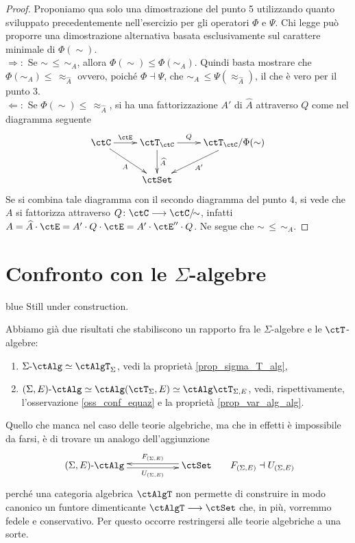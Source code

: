 \begin{proof}
 Proponiamo qua solo una dimostrazione del punto 5 utilizzando quanto sviluppato precedentemente nell'esercizio
 per gli operatori \(\Phi\) e \(\Psi\). Chi legge può proporre una dimostrazione alternativa basata esclusivamente
 sul carattere minimale di \(\Phi(\sim)\). \\
 \(\Rightarrow \colon\) Se \(\sim \,\leq\, \sim_A\), allora \(\Phi(\sim) \leq \Phi(\sim_A)\). Quindi basta mostrare che
 \(\Phi(\sim_A) \leq\, \approx_{\widehat{A}}\) ovvero, poiché \(\Phi \dashv \Psi\), che \(\sim_A \,\leq \Psi(\approx_{\widehat{A}})\),
 il che è vero per il punto 3. \\
 \(\Leftarrow \colon\) Se \(\Phi(\sim) \leq\, \approx_{\widehat{A}}\), si ha una fattorizzazione \(A'\) di \(\widehat{A}\) attraverso \(Q\) come
 nel diagramma seguente
 \[\xymatrix{\ctC \ar[r]^-{\ctE} \ar[rd]_{A}  & \ctT_\ctC \ar[r]^-{Q} \ar[d]^{\widehat{A}} & \ctT_\ctC/\Phi(\sim) \ar[ld]^{A'} \\ & \ctSet }\]
 Se si combina tale diagramma con il secondo diagramma del punto 4, si vede che \(A\) si fattorizza attraverso
 \(Q \colon \ctC \fun \ctC/{\!\sim}\), infatti \(A = \widehat{A} \cmp \ctE = A' \cmp Q \cmp \ctE = A' \cmp \ctE'' \cmp Q\).
 Ne segue che \(\sim \,\leq\, \sim_A\).
\end{proof}

\section{Confronto con le \(\Sigma\)-algebre}\label{sec_confr_sigma_T}

\begin{color}{blue}
 Still under construction.
\end{color}

\hfill

Abbiamo già due risultati che stabiliscono un rapporto fra le \(\Sigma\)-algebre e le \(\ctT\)-algebre:
\begin{enumerate}
 \item \(\ctSAlg \simeq \ctAlgT_{\Sigma}\), vedi la proprietà \ref{prop_sigma_T_alg},
 \item \(\ctSEAlg \simeq \ctAlg(\ctT_{\Sigma},E) \simeq \ctAlg\ctT_{\Sigma,E}\), vedi, rispettivamente, l'osservazione
       \ref{oss_conf_equaz} e la proprietà \ref{prop_var_alg_alg}.
\end{enumerate}

Quello che manca nel caso delle teorie algebriche, ma che in effetti è impossibile da farsi, è di trovare un analogo
dell'aggiunzione
\[\xymatrix{\ctSEAlg \ar@<-0.5ex>[rr]_-{U_{(\Sigma,E)}} & & \ctSet \ar@<-0.5ex>[ll]_-{F_{(\Sigma,E)}}}
 \;\;\;\;\;\; F_{(\Sigma,E)} \dashv U_{(\Sigma,E)}\]
perché una categoria algebrica \(\ctAlgT\) non permette di construire in modo canonico un funtore dimenticante
\(\ctAlgT \fun \ctSet\) che, in più, vorremmo fedele e conservativo. Per questo occorre restringersi alle
teorie algebriche a una sorte.

